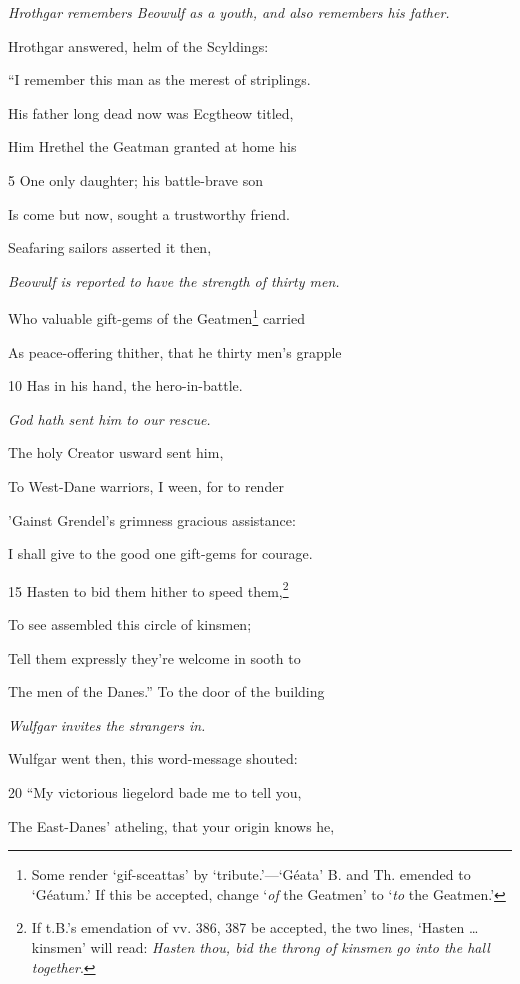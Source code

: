 
\emph{Hrothgar remembers
Beowulf as a
youth, and also
remembers his
father.}

Hrothgar answered, helm of the Scyldings:

“I remember this man as the merest of striplings.

His father long dead now was Ecgtheow titled,

Him Hrethel the Geatman granted at home his

5
One only daughter; his battle-brave son

Is come but now, sought a trustworthy friend.

Seafaring sailors asserted it then,

\emph{Beowulf is reported
to have the
strength of thirty
men.}

Who valuable gift-gems of the Geatmen\footnote{Some render ‘gif-sceattas’ by ‘tribute.’—‘Géata’ B. and Th. emended to
‘Géatum.’ If this be accepted, change ‘\emph{of} the Geatmen’ to ‘\emph{to} the Geatmen.’} carried

As peace-offering thither, that he thirty men’s grapple

10
Has in his hand, the hero-in-battle.

\emph{God hath sent him
to our rescue.}

The holy Creator usward sent him,

To West-Dane warriors, I ween, for to render

’Gainst Grendel’s grimness gracious assistance:

I shall give to the good one gift-gems for courage.

15
Hasten to bid them hither to speed them,\footnote{If t.B.’s emendation of vv. 386, 387 be accepted, the two lines, ‘Hasten
… kinsmen’ will read: \emph{Hasten thou, bid the throng of kinsmen go into the
hall together}.}

To see assembled this circle of kinsmen;

Tell them expressly they’re welcome in sooth to

The men of the Danes.” To the door of the building

\emph{Wulfgar invites the
strangers in.}

Wulfgar went then, this word-message shouted:

20
“My victorious liegelord bade me to tell you,

The East-Danes’ atheling, that your origin knows he,

